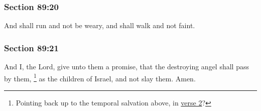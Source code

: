 	\subsubsection{Section 89:20} %
		\label{DC89-20}

		And shall run and not be weary, and shall walk and not faint.


	\subsubsection{Section 89:21} %
		\label{DC89-21}

		And I, the Lord, give unto them a promise, that the destroying angel shall pass by them,%
			\footnote{%
				Pointing back up to the temporal salvation above, in \hyperref[DC89-2]{verse 2}?
				}
		as the children of Israel, and not slay them.  Amen.

